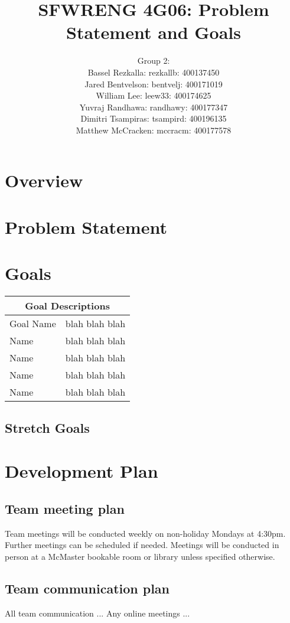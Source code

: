 \documentclass[12pt]{article}
\title{SFWRENG 4G06: Problem Statement and Goals}
\author{Group 2: \\ Bassel Rezkalla: rezkallb: 400137450 \\ Jared Bentvelson: bentvelj: 400171019 \\ William Lee: leew33: 400174625 \\ Yuvraj Randhawa: randhawy: 400177347 \\ Dimitri Tsampiras: tsampird: 400196135 \\ Matthew McCracken: mccracm: 400177578}
\begin{document}
	
	
	
	\maketitle

	
\section {Overview}

\section {Problem Statement}

\section {Goals}
	\begin{tabular}{ |p{6cm}|p{10cm}| }
		\hline
		\multicolumn{2}{|c|}{Goal Descriptions} \\
		\hline
		Goal Name & blah blah blah \\
		\hline
		Name & blah blah blah \\
		\hline
		Name & blah blah blah \\
		\hline
		Name & blah blah blah \\
		\hline
		Name & blah blah blah \\
		\hline
	\end{tabular}

\subsection{Stretch Goals}

\section {Development Plan}

\subsection{Team meeting plan}
Team meetings will be conducted weekly on non-holiday Mondays at 4:30pm.
Further meetings can be scheduled if needed.
Meetings will be conducted in person at a McMaster bookable room or library unless specified otherwise.

\subsection{Team communication plan}
All team communication ...
Any online meetings ...
\end{document}
